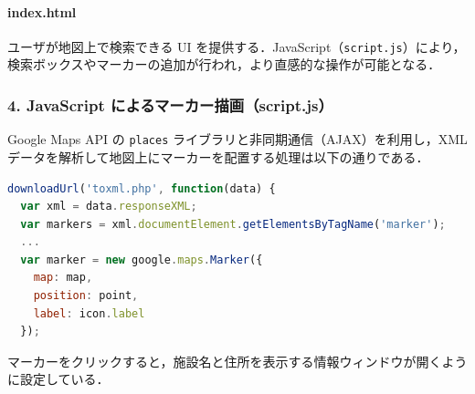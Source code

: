 \paragraph*{index.html}
ユーザが地図上で検索できる UI を提供する．JavaScript（\texttt{script.js}）により，検索ボックスやマーカーの追加が行われ，より直感的な操作が可能となる．

\subsubsection*{4. JavaScript によるマーカー描画（script.js）}

Google Maps API の \texttt{places} ライブラリと非同期通信（AJAX）を利用し，XML データを解析して地図上にマーカーを配置する処理は以下の通りである．

\begin{lstlisting}[language=javascript]
downloadUrl('toxml.php', function(data) {
  var xml = data.responseXML;
  var markers = xml.documentElement.getElementsByTagName('marker');
  ...
  var marker = new google.maps.Marker({
    map: map,
    position: point,
    label: icon.label
  });
\end{lstlisting}

マーカーをクリックすると，施設名と住所を表示する情報ウィンドウが開くように設定している．

